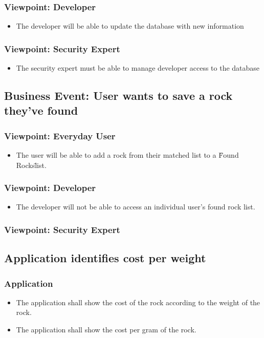 \documentclass[titlepage]{article}
\begin{document}
	\subsubsection {Viewpoint: Developer}
		\begin{itemize}
			\item The developer will be able to update the database with new information
		\end{itemize}
	\subsubsection {Viewpoint: Security Expert}
		\begin{itemize}
			\item The security expert must be able to manage developer access to the database
		\end{itemize}
\subsection {Business Event: User wants to save a rock they've found}
	\subsubsection {Viewpoint: Everyday User}
		\begin{itemize}
			\item The user will be able to add a rock from their matched list to a \"Found Rocks\" list.
		\end{itemize}
	\subsubsection {Viewpoint: Developer}
		\begin{itemize}
			\item The developer will not be able to access an individual user's found rock list.
		\end{itemize}
	\subsubsection {Viewpoint: Security Expert}
\subsection{Application identifies cost per weight }
\subsubsection{Application}
\begin{itemize}

  \item The application shall show the cost of the rock according to the weight of the rock. 
  \item The application shall show the cost per gram of the rock.
  \end{itemize}
\end{document}
